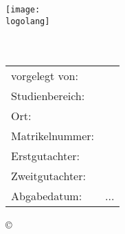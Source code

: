\thispagestyle{plain}
\begin{titlepage}
	\begin{center}
		\vspace*{2.5cm}
		\texttt{[image: \\logolang]}\\[1.25cm]
		\Large{\textbf{\art}}\\[1.5ex]
		\LARGE{\textbf{\titel}}\\[3.5ex]
		

		\normalsize
		\begin{tabular}{p{5.4cm}p{7cm}}\\
			vorgelegt von:  & \quad \autor\\[1.2ex]
			Studienbereich: & \quad \studienbereich\\[1.2ex]
			Ort: & \quad \ort\\[1.2ex]
			Matrikelnummer: & \quad \matrikelnr\\[1.2ex]
			Erstgutachter:  & \quad \erstgutachter\\[1.2ex]
			Zweitgutachter: & \quad \zweitgutachter\\[8ex]
			Abgabedatum:    & \quad ...
		\end{tabular}
		
		\copyright\ \jahr\\[9ex]
	\end{center}
	
	
\end{titlepage}